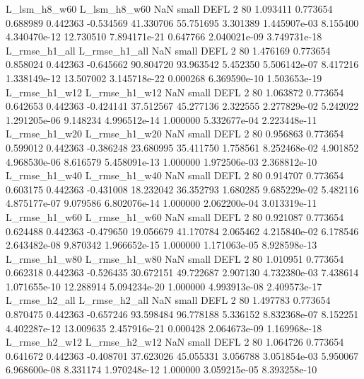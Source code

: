   L_lsm_h8_w60   L_lsm_h8_w60                   NaN      small     DEFL                 2 80 1.093411       0.773654 0.688989       0.442363   -0.534569     41.330706     55.751695     3.301389   1.445907e-03  8.155400 4.340470e-12    12.730510   7.894171e-21            0.647766    2.040021e-09        3.749731e-18
 L_rmse_h1_all  L_rmse_h1_all                   NaN      small     DEFL                 2 80 1.476169       0.773654 0.858024       0.442363   -0.645662     90.804720     93.963542     5.452350   5.506142e-07  8.417216 1.338149e-12    13.507002   3.145718e-22            0.000268    6.369590e-10        1.503653e-19
 L_rmse_h1_w12  L_rmse_h1_w12                   NaN      small     DEFL                 2 80 1.063872       0.773654 0.642653       0.442363   -0.424141     37.512567     45.277136     2.322555   2.277829e-02  5.242022 1.291205e-06     9.148234   4.996512e-14            1.000000    5.332677e-04        2.223448e-11
 L_rmse_h1_w20  L_rmse_h1_w20                   NaN      small     DEFL                 2 80 0.956863       0.773654 0.599012       0.442363   -0.386248     23.680995     35.411750     1.758561   8.252468e-02  4.901852 4.968530e-06     8.616579   5.458091e-13            1.000000    1.972506e-03        2.368812e-10
 L_rmse_h1_w40  L_rmse_h1_w40                   NaN      small     DEFL                 2 80 0.914707       0.773654 0.603175       0.442363   -0.431008     18.232042     36.352793     1.680285   9.685229e-02  5.482116 4.875177e-07     9.079586   6.802076e-14            1.000000    2.062200e-04        3.013319e-11
 L_rmse_h1_w60  L_rmse_h1_w60                   NaN      small     DEFL                 2 80 0.921087       0.773654 0.624488       0.442363   -0.479650     19.056679     41.170784     2.065462   4.215840e-02  6.178546 2.643482e-08     9.870342   1.966652e-15            1.000000    1.171063e-05        8.928598e-13
 L_rmse_h1_w80  L_rmse_h1_w80                   NaN      small     DEFL                 2 80 1.010951       0.773654 0.662318       0.442363   -0.526435     30.672151     49.722687     2.907130   4.732380e-03  7.438614 1.071655e-10    12.288914   5.094234e-20            1.000000    4.993913e-08        2.409573e-17
 L_rmse_h2_all  L_rmse_h2_all                   NaN      small     DEFL                 2 80 1.497783       0.773654 0.870475       0.442363   -0.657246     93.598484     96.778188     5.336152   8.832368e-07  8.152251 4.402287e-12    13.009635   2.457916e-21            0.000428    2.064673e-09        1.169968e-18
 L_rmse_h2_w12  L_rmse_h2_w12                   NaN      small     DEFL                 2 80 1.064726       0.773654 0.641672       0.442363   -0.408701     37.623026     45.055331     3.056788   3.051854e-03  5.950067 6.968600e-08     8.331174   1.970248e-12            1.000000    3.059215e-05        8.393258e-10
